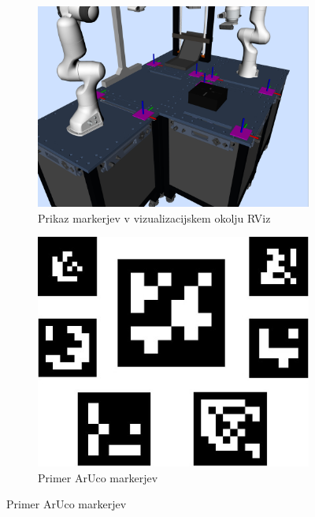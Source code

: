 \documentclass[a4paper,twoside,openright,12pt,slovene]{book}
\begin{document}
\begin{figure}
     \centering
      \begin{subfigure}{0.6\textwidth}
         \centering
         \includegraphics[width=\textwidth]{Slike/marker_table.png}
         \caption{Prikaz markerjev v vizualizacijskem okolju RViz}
         \label{markertable}
     \end{subfigure}
     \hfill
     \begin{subfigure}{0.3\textwidth}
         \centering
         \includegraphics[width=\textwidth]{Slike/markerz.jpg}
         \caption{Primer ArUco markerjev}
         \label{marker}
     \end{subfigure}
     \hfill
        \label{markerji}
\end{figure}
\end{document}

